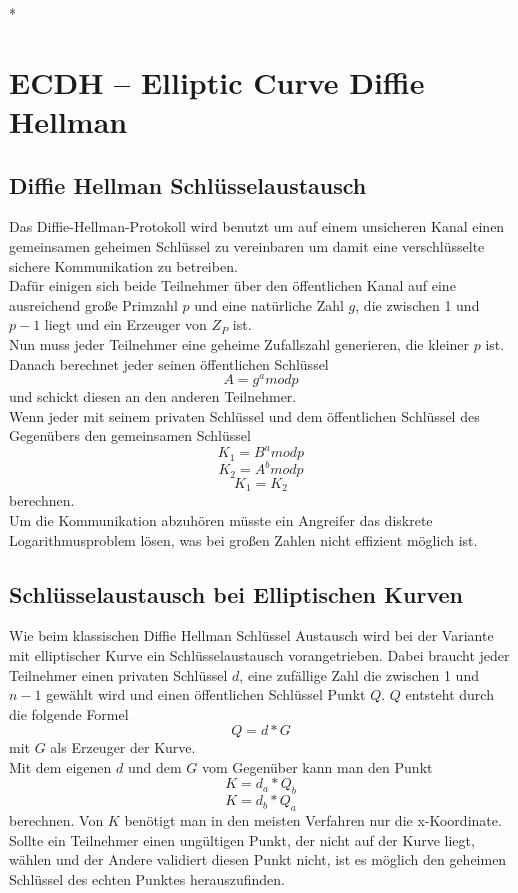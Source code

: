 *%
\chapter{ECDH – Elliptic Curve Diffie Hellman}
\section{Diffie Hellman Schlüsselaustausch}
Das Diffie-Hellman-Protokoll wird benutzt um auf einem unsicheren Kanal einen gemeinsamen geheimen Schlüssel zu vereinbaren um damit eine verschlüsselte sichere Kommunikation zu betreiben.\\
Dafür einigen sich beide Teilnehmer über den öffentlichen Kanal auf eine ausreichend große Primzahl \(p\) und eine natürliche Zahl \(g\), die zwischen 1 und \(p-1\) liegt und ein Erzeuger von \(Z_P\) ist.\\
Nun muss jeder Teilnehmer eine geheime Zufallszahl generieren, die kleiner \(p\) ist. Danach berechnet jeder seinen öffentlichen Schlüssel \[A = g^a mod p\] und schickt diesen an den anderen Teilnehmer.\\
Wenn jeder mit seinem privaten Schlüssel und dem öffentlichen Schlüssel des Gegenübers den gemeinsamen Schlüssel \[K_1 = B^a mod p\] \[K_2 = A^b mod p\] \[K_1 = K_2\] berechnen.\\
Um die Kommunikation abzuhören müsste ein Angreifer das diskrete Logarithmusproblem lösen, was bei großen Zahlen nicht effizient möglich ist.

\section{Schlüsselaustausch bei Elliptischen Kurven}
Wie beim klassischen Diffie Hellman Schlüssel Austausch wird bei der Variante mit elliptischer Kurve ein Schlüsselaustausch vorangetrieben. Dabei braucht jeder Teilnehmer einen privaten Schlüssel \(d\), eine zufällige Zahl die zwischen 1 und \(n-1\) gewählt wird und einen öffentlichen Schlüssel Punkt \(Q\). \(Q\) entsteht durch die folgende Formel \[ Q = d * G\] mit \(G\) als Erzeuger der Kurve.\\ 
Mit dem eigenen \(d\) und dem \(G\) vom Gegenüber kann man den Punkt \[K = d_a * Q_b\] \[K = d_b * Q_a\] berechnen. Von \(K\) benötigt man in den meisten Verfahren nur die x-Koordinate.\\
Sollte ein Teilnehmer einen ungültigen Punkt, der nicht auf der Kurve liegt, wählen und der Andere validiert diesen Punkt nicht, ist es möglich den geheimen Schlüssel des echten Punktes herauszufinden.